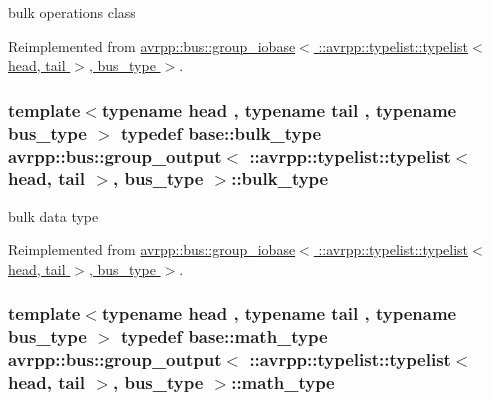 bulk operations class 



Reimplemented from \hyperlink{structavrpp_1_1bus_1_1group__iobase_3_01_1_1avrpp_1_1typelist_1_1typelist_3_01head_00_01tail_01_4_00_01bus__type_01_4_afef5ea0856142cfafc467b0c45a86505}{avrpp::bus::group\_\-iobase$<$ ::avrpp::typelist::typelist$<$ head, tail $>$, bus\_\-type $>$}.

\hypertarget{structavrpp_1_1bus_1_1group__output_3_01_1_1avrpp_1_1typelist_1_1typelist_3_01head_00_01tail_01_4_00_01bus__type_01_4_ac7b77056128a6aca8a53b79e95feaaed}{
\subsubsection[{bulk\_\-type}]{\setlength{\rightskip}{0pt plus 5cm}template$<$typename head , typename tail , typename bus\_\-type $>$ typedef base::bulk\_\-type avrpp::bus::group\_\-output$<$ ::{\bf avrpp::typelist::typelist}$<$ head, tail $>$, bus\_\-type $>$::{\bf bulk\_\-type}}}
\label{structavrpp_1_1bus_1_1group__output_3_01_1_1avrpp_1_1typelist_1_1typelist_3_01head_00_01tail_01_4_00_01bus__type_01_4_ac7b77056128a6aca8a53b79e95feaaed}


bulk data type 



Reimplemented from \hyperlink{structavrpp_1_1bus_1_1group__iobase_3_01_1_1avrpp_1_1typelist_1_1typelist_3_01head_00_01tail_01_4_00_01bus__type_01_4_ac5f551221d1d4e6bb1cb6b5ec9f564d5}{avrpp::bus::group\_\-iobase$<$ ::avrpp::typelist::typelist$<$ head, tail $>$, bus\_\-type $>$}.

\hypertarget{structavrpp_1_1bus_1_1group__output_3_01_1_1avrpp_1_1typelist_1_1typelist_3_01head_00_01tail_01_4_00_01bus__type_01_4_a00f5369cee28e57effbee4aafabd0d47}{
\subsubsection[{math\_\-type}]{\setlength{\rightskip}{0pt plus 5cm}template$<$typename head , typename tail , typename bus\_\-type $>$ typedef base::math\_\-type avrpp::bus::group\_\-output$<$ ::{\bf avrpp::typelist::typelist}$<$ head, tail $>$, bus\_\-type $>$::{\bf math\_\-type}}}
\label{structavrpp_1_1bus_1_1group__output_3_01_1_1avrpp_1_1typelist_1_1typelist_3_01head_00_01tail_01_4_00_01bus__type_01_4_a00f5369cee28e57effbee4aafabd0d47}


